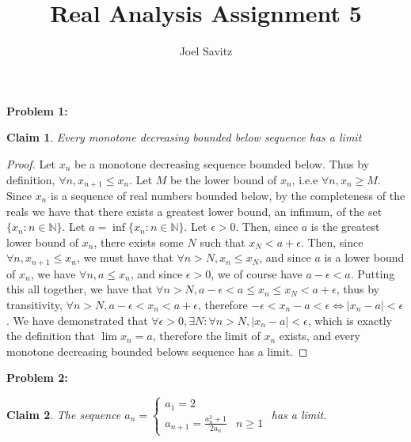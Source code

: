 \documentclass{article}
\title{Real Analysis Assignment 5}
\author{Joel Savitz}
\newcommand{\nats}{\ensuremath{\mathbb{N}}}
\newcommand{\eps}{\ensuremath{\epsilon}}
\newtheorem{clm}{Claim}
\begin{document}
\maketitle

\textbf{Problem 1:}

\begin{clm}
	Every monotone decreasing bounded below sequence has a limit
\end{clm}

\begin{proof}
	Let $x_n$ be a monotone decreasing sequence bounded below.
	Thus by definition, $\forall n, x_{n+1} \le x_n$.
	Let $M$ be the lower bound of $x_n$, i.e.e $\forall n, x_n \geq M$.
	Since $x_n$ is a sequence of real numbers bounded below,
	by the completeness of the reals we have that there exists
	a greatest lower bound, an infimum, of the set $\{ x_n : n \in \nats \}$.
	Let $a = \inf\{x_n : n \in \nats \}$.
	Let $\eps > 0$.
	Then, since $a$ is the greatest lower bound of $x_n$,
	there exists some $N$ such that $x_N < a + \eps$.
	Then, since $\forall n, x_{n+1} \le x_n$,
	we must have that $\forall n > N, x_n \le x_N$,
	and since $a$ is a lower bound of $x_n$,
	we have $\forall n, a \le x_n$, and since $\eps > 0$,
	we of course have $a - \eps < a$.
	Putting this all together,
	we have that $\forall n > N, a - \eps < a \le x_n \le x_N < a + \eps$,
	thus by transitivity, $\forall n > N, a - \eps < x_n < a + \eps$,
	therefore $-\eps < x_n - a < \eps \iff | x_n - a | < \eps$.
	We have demonstrated that
	$\forall \eps > 0, \exists N: \forall n > N, | x_n - a | < \eps$,
	which is exactly the definition that $\lim x_n = a$,
	therefore the limit of $x_n$ exists,
	and every monotone decreasing bounded belows sequence has a limit.
\end{proof}

\textbf{Problem 2:}


\begin{clm}
	The sequence $a_n = \begin{cases} a_1 = 2 \\ a_{n+1} = \frac{a_n^2 + 1}{2a_n} & n \geq 1 \end{cases}$ has a limit.
\end{clm}
\end{document}

